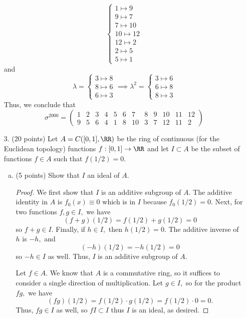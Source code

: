 \documentclass{article}
\begin{document}
\begin{itemize}
\begin{soln}
\[\begin{cases}
					1\mapsto 9 \\
					9\mapsto 7 \\
					7\mapsto 10 \\
					10\mapsto 12 \\
					12\mapsto 2 \\
					2\mapsto 5 \\
					5\mapsto 1
			\end{cases}\]
			and
			\[\lambda=\begin{cases}
					3\mapsto 8 \\
					8\mapsto 6 \\
					6\mapsto 3
				\end{cases}\implies \lambda^2 = \begin{cases}
					3\mapsto 6 \\
					6\mapsto 8 \\
					8\mapsto 3
			\end{cases}\]
			Thus, we conclude that \[\sigma^{2000} = \begin{pmatrix}
					1 & 2 & 3 & 4 & 5 & 6 & 7 & 8 & 9 & 10 & 11 & 12 \\
					9 & 5 & 6 & 4 & 1 & 8 & 10 & 3 & 7 & 12 & 11 & 2
			\end{pmatrix}\]
		\end{soln}

		\newpage

	\item[3.] (20 points) Let $A=C([0, 1], \RR)$ be the ring of continuous (for the Euclidean topology) functions $f:[0, 1]\to\RR$ and let $I\subset A$ be the subset of functions $f\in A$ such that $f(1/2)=0.$
		\begin{enumerate}[(a)]
			\item (5 points) Show that $I$ an ideal of $A.$
				\begin{proof}
					We first show that $I$ is an additive subgroup of $A.$ The additive identity in $A$ is $f_0(x)\equiv0$ which is in $I$ because $f_0(1/2)=0.$ Next, for two functions $f, g\in I,$ we have
					\[(f+g)(1/2) = f(1/2) + g(1/2) = 0\]
					so $f+g\in I.$ Finally, if $h\in I,$ then $h(1/2)=0.$ The additive inverse of $h$ is $-h,$ and 
					\[(-h)(1/2)=-h(1/2)=0\]
					so $-h\in I$ as well. Thus, $I$ is an additive subgroup of $A.$

					Let $f\in A.$ We know that $A$ is a commutative ring, so it suffices to consider a single direction of multiplication. Let $g\in I,$ so for the product $fg,$ we have
					\[(fg)(1/2) = f(1/2)\cdot g(1/2) = f(1/2) \cdot 0 = 0.\]
					Thus, $fg\in I$ as well, so $fI\subset I$ thus $I$ is an ideal, as desired.
				\end{proof}


\end{enumerate}
\end{itemize}
\end{document}
